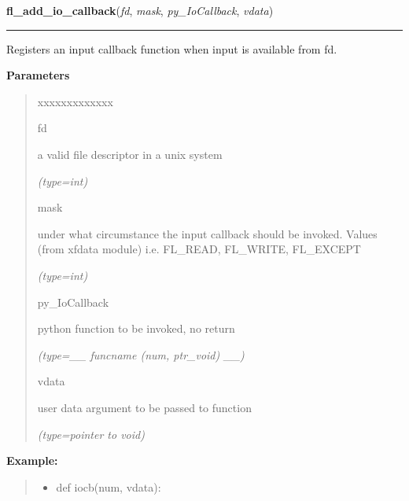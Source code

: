 \hspace{.8\funcindent}\begin{boxedminipage}{\funcwidth}

    \raggedright \textbf{fl\_add\_io\_callback}(\textit{fd}, \textit{mask}, \textit{py\_IoCallback}, \textit{vdata})

    \vspace{-1.5ex}

    \rule{\textwidth}{0.5\fboxrule}
\setlength{\parskip}{2ex}
    Registers an input callback function when input is available from fd.

\setlength{\parskip}{1ex}
      \textbf{Parameters}
      \vspace{-1ex}

      \begin{quote}
        \begin{Ventry}{xxxxxxxxxxxxx}

          \item[fd]

          a valid file descriptor in a unix system

            {\it (type=int)}

          \item[mask]

          under what circumstance the input callback should be invoked. 
          Values (from xfdata module) i.e. FL\_READ, FL\_WRITE, FL\_EXCEPT

            {\it (type=int)}

          \item[py\_IoCallback]

          python function to be invoked, no return

            {\it (type=\_\_ funcname (num, ptr\_void) \_\_)}

          \item[vdata]

          user data argument to be passed to function

            {\it (type=pointer to void)}

        \end{Ventry}

      \end{quote}

\textbf{Example:}
\begin{quote}
  \begin{itemize}

  \item
    \setlength{\parskip}{0.6ex}
def iocb(num, vdata):




\end{itemize}
\end{quote}
\end{boxedminipage}
